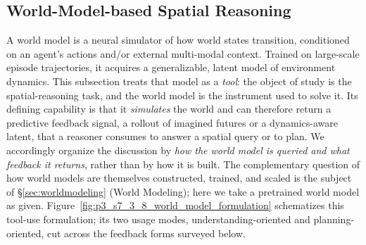 \subsection{World-Model-based Spatial Reasoning}
\label{subsec:p3_s7_3_8}








A world model is a neural simulator of how world states transition, conditioned on an agent's actions and/or external multi-modal context.
Trained on large-scale episode trajectories, it acquires a generalizable, latent model of environment dynamics.
This subsection treats that model as a \emph{tool}: the object of study is the spatial-reasoning task, and the world model is the instrument used to solve it.
Its defining capability is that it \emph{simulates} the world and can therefore return a predictive feedback signal, a rollout of imagined futures or a dynamics-aware latent, that a reasoner consumes to answer a spatial query or to plan.
We accordingly organize the discussion by \emph{how the world model is queried and what feedback it returns}, rather than by how it is built.
The complementary question of how world models are themselves constructed, trained, and scaled is the subject of §\ref{sec:worldmodeling} (World Modeling); here we take a pretrained world model as given.
Figure~\ref{fig:p3_s7_3_8_world_model_formulation} schematizes this tool-use formulation; its two usage modes, understanding-oriented and planning-oriented, cut across the feedback forms surveyed below.

